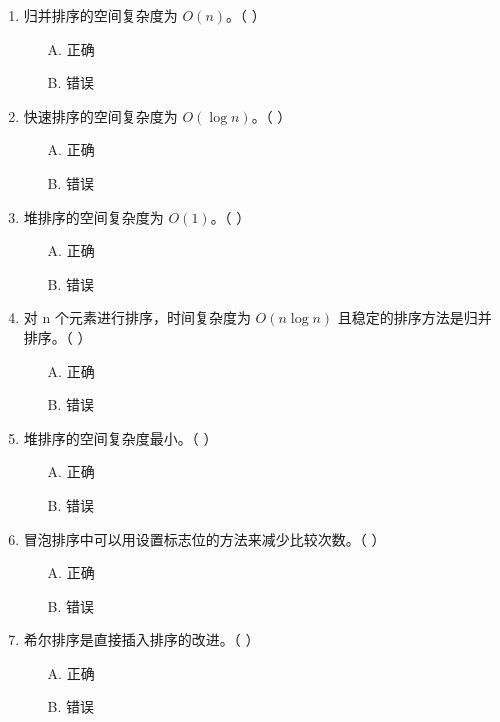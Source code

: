 \documentclass[12pt, a4paper]{article}
\begin{document}
\begin{enumerate}[label=\arabic*.]
	\item 归并排序的空间复杂度为 $O(n)$。（ ）
	      \begin{enumerate}
		      \item[A.] 正确
		      \item[B.] 错误
	      \end{enumerate}

	\item 快速排序的空间复杂度为 $O(\log n)$。（ ）
	      \begin{enumerate}
		      \item[A.] 正确
		      \item[B.] 错误
	      \end{enumerate}

	\item 堆排序的空间复杂度为 $O(1)$。（ ）
	      \begin{enumerate}
		      \item[A.] 正确
		      \item[B.] 错误
	      \end{enumerate}

	\item 对 n 个元素进行排序，时间复杂度为 $O(n \log n)$ 且稳定的排序方法是归并排序。（ ）
	      \begin{enumerate}
		      \item[A.] 正确
		      \item[B.] 错误
	      \end{enumerate}

	\item 堆排序的空间复杂度最小。（ ）
	      \begin{enumerate}
		      \item[A.] 正确
		      \item[B.] 错误
	      \end{enumerate}

	\item 冒泡排序中可以用设置标志位的方法来减少比较次数。（ ）
	      \begin{enumerate}
		      \item[A.] 正确
		      \item[B.] 错误
	      \end{enumerate}

	\item 希尔排序是直接插入排序的改进。（ ）
	      \begin{enumerate}
		      \item[A.] 正确
		      \item[B.] 错误
	      \end{enumerate}


\end{enumerate}
\end{document}

